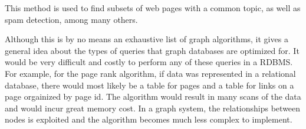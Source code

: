 This method is used to find subsets of web pages with a common topic, as well as spam detection, among many others\cite{triangles}.
\par
Although this is by no means an exhaustive list of graph algorithms, it gives a general idea about the types of queries that graph databases are optimized for. It would be very difficult and costly to perform any of these queries in a RDBMS. For example, for the page rank algorithm, if data was represented in a relational database, there would most likely be a table for pages and a table for links on a page orgainized by page id. The algorithm would result in many scans of the data and would incur great memory cost. In a graph system, the relationships between nodes is exploited and the algorithm becomes much less complex to implement.
